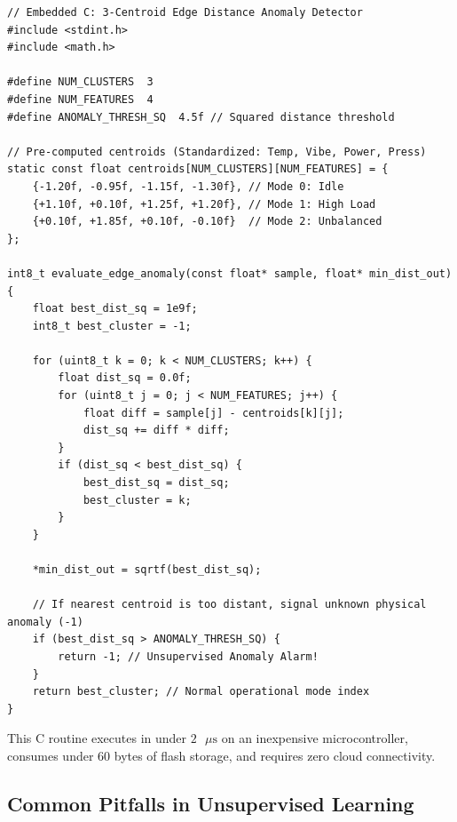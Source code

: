 \begin{iotbox}
\begin{lstlisting}[style=pythonstyle]
// Embedded C: 3-Centroid Edge Distance Anomaly Detector
#include <stdint.h>
#include <math.h>

#define NUM_CLUSTERS  3
#define NUM_FEATURES  4
#define ANOMALY_THRESH_SQ  4.5f // Squared distance threshold

// Pre-computed centroids (Standardized: Temp, Vibe, Power, Press)
static const float centroids[NUM_CLUSTERS][NUM_FEATURES] = {
    {-1.20f, -0.95f, -1.15f, -1.30f}, // Mode 0: Idle
    {+1.10f, +0.10f, +1.25f, +1.20f}, // Mode 1: High Load
    {+0.10f, +1.85f, +0.10f, -0.10f}  // Mode 2: Unbalanced
};

int8_t evaluate_edge_anomaly(const float* sample, float* min_dist_out) {
    float best_dist_sq = 1e9f;
    int8_t best_cluster = -1;

    for (uint8_t k = 0; k < NUM_CLUSTERS; k++) {
        float dist_sq = 0.0f;
        for (uint8_t j = 0; j < NUM_FEATURES; j++) {
            float diff = sample[j] - centroids[k][j];
            dist_sq += diff * diff;
        }
        if (dist_sq < best_dist_sq) {
            best_dist_sq = dist_sq;
            best_cluster = k;
        }
    }

    *min_dist_out = sqrtf(best_dist_sq);

    // If nearest centroid is too distant, signal unknown physical anomaly (-1)
    if (best_dist_sq > ANOMALY_THRESH_SQ) {
        return -1; // Unsupervised Anomaly Alarm!
    }
    return best_cluster; // Normal operational mode index
}
\end{lstlisting}
This C routine executes in under $2\text{ }\mu\text{s}$ on an inexpensive microcontroller, consumes under $60$ bytes of flash storage, and requires zero cloud connectivity.
\end{iotbox}

\subsection{Common Pitfalls in Unsupervised Learning}\label{subsec:unsupervised_pitfalls}

